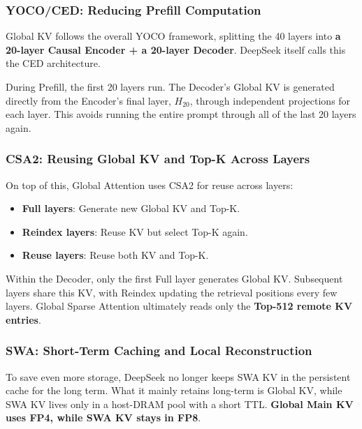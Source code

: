 \documentclass[
  11pt,
  a4paper,
]{article}
\providecommand{\tightlist}{%
  \setlength{\itemsep}{0pt}\setlength{\parskip}{0pt}}
\begin{document}
\subsubsection{YOCO/CED: Reducing Prefill
Computation}\label{yococed-reducing-prefill-computation}

Global KV follows the overall YOCO framework, splitting the 40 layers
into \textbf{a 20-layer Causal Encoder + a 20-layer Decoder}. DeepSeek
itself calls this the CED architecture.

During Prefill, the first 20 layers run. The Decoder's Global KV is
generated directly from the Encoder's final layer, \(H_{20}\), through
independent projections for each layer. This avoids running the entire
prompt through all of the last 20 layers again.

\subsubsection{CSA2: Reusing Global KV and Top-K Across
Layers}\label{csa2-reusing-global-kv-and-top-k-across-layers}

On top of this, Global Attention uses CSA2 for reuse across layers:

\begin{itemize}
\tightlist
\item
  \textbf{Full layers}: Generate new Global KV and Top-K.
\item
  \textbf{Reindex layers}: Reuse KV but select Top-K again.
\item
  \textbf{Reuse layers}: Reuse both KV and Top-K.
\end{itemize}

Within the Decoder, only the first Full layer generates Global KV.
Subsequent layers share this KV, with Reindex updating the retrieval
positions every few layers. Global Sparse Attention ultimately reads
only the \textbf{Top-512 remote KV entries}.

\subsubsection{SWA: Short-Term Caching and Local
Reconstruction}\label{swa-short-term-caching-and-local-reconstruction}

To save even more storage, DeepSeek no longer keeps SWA KV in the
persistent cache for the long term. What it mainly retains long-term is
Global KV, while SWA KV lives only in a host-DRAM pool with a short TTL.
\textbf{Global Main KV uses FP4, while SWA KV stays in FP8}.
\end{document}
